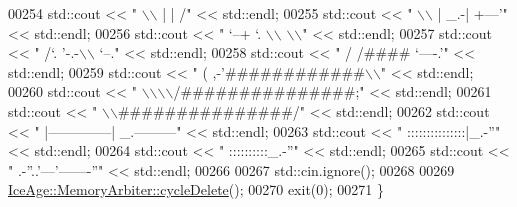 \begin{DoxyCode}
00254 std::cout << \textcolor{stringliteral}{"           \(\backslash\)\(\backslash\)       |    |       /"} << std::endl;
00255 std::cout << \textcolor{stringliteral}{"            \(\backslash\)\(\backslash\)      | \_.-|  +---'"} << std::endl;
00256 std::cout << \textcolor{stringliteral}{"             `--+   `.  \(\backslash\)\(\backslash\)   \(\backslash\)\(\backslash\)"} << std::endl;
00257 std::cout << \textcolor{stringliteral}{"                /`.  '-.-\(\backslash\)\(\backslash\)   `--."} << std::endl;
00258 std::cout << \textcolor{stringliteral}{"               /    /#### `----.'"} << std::endl;
00259 std::cout << \textcolor{stringliteral}{"              (  ,-'############\(\backslash\)\(\backslash\)"} << std::endl;
00260 std::cout << \textcolor{stringliteral}{"              \(\backslash\)\(\backslash\)\(\backslash\)\(\backslash\)/###############;"} << std::endl;
00261 std::cout << \textcolor{stringliteral}{"               \(\backslash\)\(\backslash\)###############/"} << std::endl;
00262 std::cout << \textcolor{stringliteral}{"                |--------------|     \_.---------"} << std::endl;
00263 std::cout << \textcolor{stringliteral}{"                :::::::::::::::|\_.-''"} << std::endl;
00264 std::cout << \textcolor{stringliteral}{"                 ::::::::::\_.-''"} << std::endl;
00265 std::cout << \textcolor{stringliteral}{"       .-''..'---'-------''"} << std::endl;
00266 
00267     std::cin.ignore();
00268 
00269     \hyperlink{classIceAge_1_1MemoryArbiter_ae3460492678cf992629f4a70de3ef1ca}{IceAge::MemoryArbiter::cycleDelete}();
00270     exit(0);
00271 \}
\end{DoxyCode}
